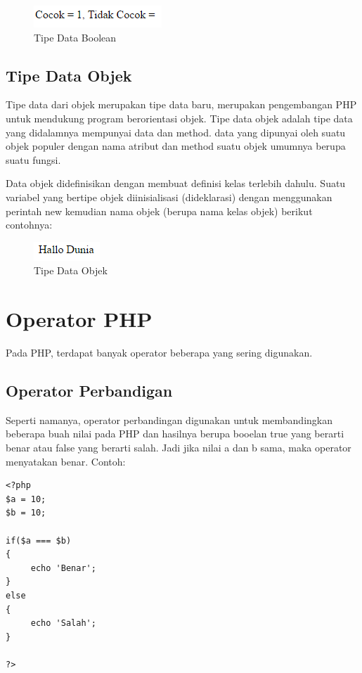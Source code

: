 \begin{figure}[h]
\centering
\includegraphics[scale=1]{figures/boolean}
\caption{Tipe Data Boolean }
\label{boolean}
\end{figure}

\subsection{Tipe Data Objek}
Tipe data dari objek merupakan tipe data baru, merupakan pengembangan PHP untuk mendukung program berorientasi objek. Tipe data objek adalah tipe data yang didalamnya mempunyai data dan method. data yang dipunyai oleh suatu objek populer dengan nama atribut dan method suatu objek umumnya berupa suatu fungsi. 

Data objek didefinisikan dengan membuat definisi kelas terlebih dahulu. Suatu variabel yang bertipe objek diinisialisasi (dideklarasi) dengan menggunakan perintah new kemudian nama objek (berupa nama kelas objek) berikut contohnya:


\begin{figure}[h]
\centering
\includegraphics[scale=1]{figures/objek}
\caption{Tipe Data Objek }
\label{objek}
\end{figure}

\section{Operator PHP}
Pada PHP, terdapat banyak operator  beberapa yang sering digunakan.
\subsection{Operator Perbandigan}
Seperti namanya, operator perbandingan digunakan untuk membandingkan beberapa buah nilai pada PHP dan hasilnya berupa booelan true yang berarti benar atau false yang berarti salah. Jadi jika nilai a dan b sama, maka operator menyatakan benar.
Contoh:

\begin{lstlisting}
<?php
$a = 10;
$b = 10;
 
if($a === $b)
{
     echo 'Benar';
}
else
{
     echo 'Salah';
}
 
?>
\end{lstlisting}


